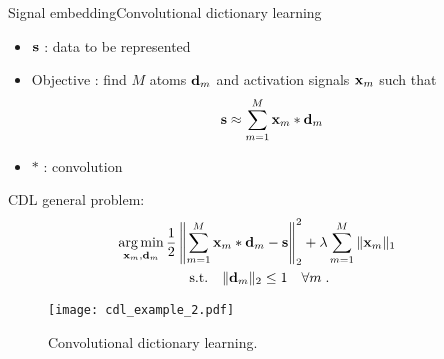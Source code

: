\begin{frame}{Signal embedding}{Convolutional dictionary learning}
\begin{minipage}[t]{0.45\linewidth}
    \begin{itemize}
        \item $\mathbf{s}$ : data to be represented
        \item Objective : find $M$ atoms $\mathbf{d}_m$ and activation signals $\mathbf{x}_m$ such that
        $$\mathbf{s} \approx \sum_{m=1}^{M}\mathbf{x}_m * \mathbf{d}_m$$
        \item $*$ : convolution
    \end{itemize}
    \pause[3]
    CDL general problem:
    \begin{gather*}\label{eq:cdl_baseform}
    \operatorname*{arg\,min}_{\mathbf{x}_m,\mathbf{d}_m} \frac{1}{2} \left\| \sum_{m=1}^{M} \mathbf{x}_{m} * \mathbf{d}_m - \mathbf{s} \right\|_2^2 + \lambda \sum_{m=1}^{M} \|\mathbf{x}_m \|_1 \ \\
        \text{s.t.}\quad \| \mathbf{d}_m\|_2 \leq 1 \quad \forall m \;. \nonumber
    \end{gather*}
\end{minipage}\hfill
\begin{minipage}[t]{0.4\linewidth}
    \centering
    \pause[2]
    \begin{figure}[h]
        \centering
        \texttt{[image: cdl\_example\_2.pdf]}\\
        \caption{Convolutional dictionary learning.}
    \end{figure}
\end{minipage}

\end{frame}

